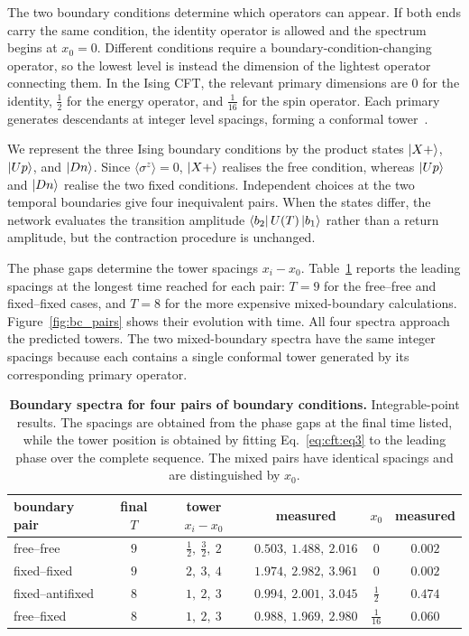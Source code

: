 The two boundary conditions determine which operators can appear. If both ends carry the same condition, the identity operator is allowed and the spectrum begins at $x_0=0$. Different conditions require a boundary-condition-changing operator, so the lowest level is instead the dimension of the lightest operator connecting them. In the Ising \ac{CFT}, the relevant primary dimensions are $0$ for the identity, $\tfrac12$ for the energy operator, and $\tfrac1{16}$ for the spin operator. Each primary generates descendants at integer level spacings, forming a conformal tower~\cite{cardy1989,cardy2004bcft}.

We represent the three Ising boundary conditions by the product states $\ket{X+}$, $\ket{Up}$, and $\ket{Dn}$. Since $\langle\sigma^z\rangle=0$, $\ket{X+}$ realises the free condition, whereas $\ket{Up}$ and $\ket{Dn}$ realise the two fixed conditions. Independent choices at the two temporal boundaries give four inequivalent pairs. When the states differ, the network evaluates the transition amplitude $\bra{b_2}U(T)\ket{b_1}$ rather than a return amplitude, but the contraction procedure is unchanged.

The phase gaps determine the tower spacings $x_i-x_0$. Table~\ref{tab:bc_pairs} reports the leading spacings at the longest time reached for each pair: $T=9$ for the free--free and fixed--fixed cases, and $T=8$ for the more expensive mixed-boundary calculations. Figure~\ref{fig:bc_pairs} shows their evolution with time. All four spectra approach the predicted towers. The two mixed-boundary spectra have the same integer spacings because each contains a single conformal tower generated by its corresponding primary operator.

\begin{table}[!htb]
  \centering
  \begin{tabular}{lccccc}
    \hline
    boundary pair    & final $T$ & tower $x_i-x_0$           & measured                & $x_0$         & measured \\
    \hline
    free--free       & $9$       & $\tfrac12,\ \tfrac32,\ 2$ & $0.503,\ 1.488,\ 2.016$ & $0$           & $0.002$  \\
    fixed--fixed     & $9$       & $2,\ 3,\ 4$               & $1.974,\ 2.982,\ 3.961$ & $0$           & $0.002$  \\
    fixed--antifixed & $8$       & $1,\ 2,\ 3$               & $0.994,\ 2.001,\ 3.045$ & $\tfrac12$    & $0.474$  \\
    free--fixed      & $8$       & $1,\ 2,\ 3$               & $0.988,\ 1.969,\ 2.980$ & $\tfrac1{16}$ & $0.060$  \\
    \hline
  \end{tabular}
  \caption{\textbf{Boundary spectra for four pairs of boundary conditions.} Integrable-point results. The spacings are obtained from the phase gaps at the final time listed, while the tower position is obtained by fitting Eq.~\eqref{eq:cft:eq3} to the leading phase over the complete sequence. The mixed pairs have identical spacings and are distinguished by $x_0$.}
  \label{tab:bc_pairs}
\end{table}

